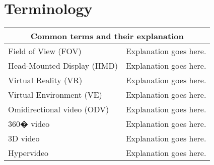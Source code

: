 \section{Terminology}

\begin{tabular}{ | p{5.5cm} | p{6.5cm} |  }
	\hline
     	\multicolumn{2}{|c|}{Common terms and their explanation} \\
     	\hline
	     Field of View (FOV) & Explanation goes here. \\
    	\hline
     	Head-Mounted Display (HMD) & Explanation goes here. \\
    	\hline
     	Virtual Reality (VR) & Explanation goes here. \\
    	\hline
	Virtual Environment (VE) & Explanation goes here. \\
     	\hline
    	Omidirectional video (ODV) & Explanation goes here. \\
    	\hline
     	360� video & Explanation goes here. \\
     	\hline
     	3D video & Explanation goes here. \\
     	\hline
     	Hypervideo & Explanation goes here. \\
	\hline
\end{tabular}
